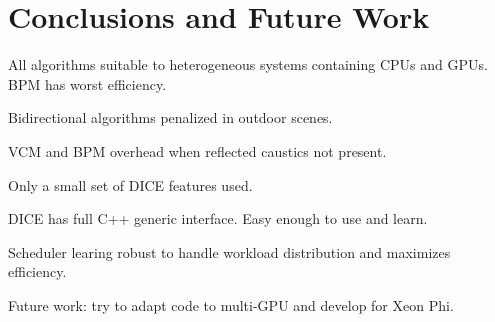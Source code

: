 \chapter{Conclusions and Future Work}

All algorithms suitable to heterogeneous systems containing CPUs and GPUs. BPM has worst efficiency.

Bidirectional algorithms penalized in outdoor scenes.

VCM and BPM overhead when reflected caustics not present.

Only a small set of DICE features used.

DICE has full C++ generic interface. Easy enough to use and learn.

Scheduler learing robust to handle workload distribution and maximizes efficiency.

Future work: try to adapt code to multi-GPU and develop for Xeon Phi.
